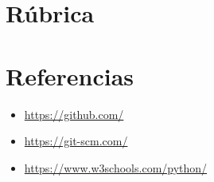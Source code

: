 \documentclass{article}
\begin{document}
\section{Rúbrica}

\section{Referencias}
\begin{itemize}
	\item \url{https://github.com/}
	\item \url{https://git-scm.com/}
	\item \url{https://www.w3schools.com/python/}
\end{itemize}

\pagebreak



\end{document}
